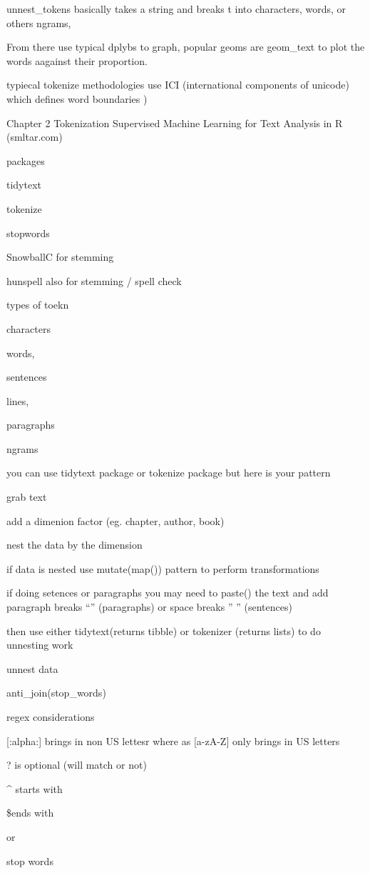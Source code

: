 \documentclass[
  letterpaper,
  DIV=11,
  numbers=noendperiod]{scrreprt}
\begin{document}
unnest\_tokens basically takes a string and breaks t into characters,
words, or others ngrams,

From there use typical dplybs to graph, popular geoms are geom\_text to
plot the words aagainst their proportion.

typiecal tokenize methodologies use ICI (international components of
unicode) which defines word boundaries )

Chapter 2 Tokenization \textbar{} Supervised Machine Learning for Text
Analysis in R (smltar.com)

packages

tidytext

tokenize

stopwords

SnowballC for stemming

hunspell also for stemming / spell check

types of toekn

characters

words,

sentences

lines,

paragraphs

ngrams

you can use tidytext package or tokenize package but here is your
pattern

grab text

add a dimenion factor (eg. chapter, author, book)

nest the data by the dimension

if data is nested use mutate(map()) pattern to perform transformations

if doing setences or paragraphs you may need to paste() the text and add
paragraph breaks ``\n'' (paragraphs) or space breaks '' '' (sentences)

then use either tidytext(returns tibble) or tokenizer (returns lists) to
do unnesting work

unnest data

anti\_join(stop\_words)

regex considerations

{[}:alpha:{]} brings in non US lettesr where as {[}a-zA-Z{]} only brings
in US letters

? is optional (will match or not)

\^{} starts with

\$ends with

or

stop words
\end{document}
